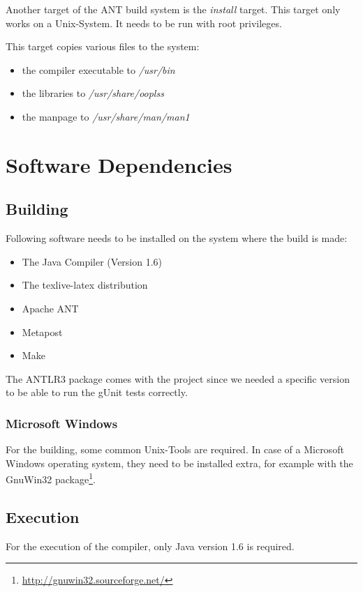Another target of the ANT build system is the \emph{install} target.
This target only works on a Unix-System. It needs to be run with root
privileges.

This target copies various files to the system:
\begin{itemize}
\item the compiler executable to \emph{/usr/bin}
\item the libraries to \emph{/usr/share/ooplss}
\item the manpage to \emph{/usr/share/man/man1}
\end{itemize}

\section{Software Dependencies}

\subsection{Building}
Following software needs to be installed on the system where the 
build is made:

\begin{itemize}
\item The Java Compiler (Version 1.6)
\item The texlive-latex distribution
\item Apache ANT
\item Metapost
\item Make
\end{itemize}

The ANTLR3 package comes with the project since we needed a specific version
to be able to run the gUnit tests correctly.


\subsubsection{Microsoft Windows}

For the building, some common Unix-Tools are required. In case of a 
Microsoft Windows operating system, they need to be installed extra, for
example with the GnuWin32 package\footnote{\href{http://gnuwin32.sourceforge.net/}{http://gnuwin32.sourceforge.net/}}.

\subsection{Execution}

For the execution of the compiler, only Java version 1.6 is required.


